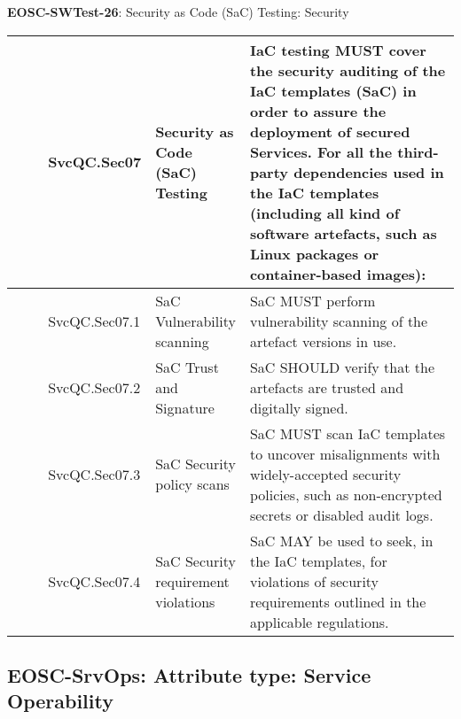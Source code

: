 \textbf{EOSC-SWTest-26}: Security as Code (SaC) Testing: Security
\nopagebreak[4]
\begin{center}
    \tabletail{\hline}
    \tiny
    \begin{supertabular}{|p{0.10\linewidth}|p{0.10\linewidth}|p{0.20\linewidth}|p{0.60\linewidth}|} \hline
        \cite{orviz_fernandez_eosc-synergy_2020} & SvcQC.Sec07 & Security as Code (SaC) Testing & IaC testing MUST cover the security auditing of the IaC templates (SaC) in order to assure the deployment of secured Services. For all the third-party dependencies used in the IaC templates (including all kind of software artefacts, such as Linux packages or container-based images):\\ \hline
        \cite{orviz_fernandez_eosc-synergy_2020} & SvcQC.Sec07.1 & SaC Vulnerability scanning & SaC MUST perform vulnerability scanning of the artefact versions in use.\\ \hline
        \cite{orviz_fernandez_eosc-synergy_2020} & SvcQC.Sec07.2 & SaC Trust and Signature & SaC SHOULD verify that the artefacts are trusted and digitally signed.\\ \hline
        \cite{orviz_fernandez_eosc-synergy_2020} & SvcQC.Sec07.3 & SaC Security policy scans & SaC MUST scan IaC templates to uncover misalignments with widely-accepted security policies, such as non-encrypted secrets or disabled audit logs.\\ \hline
        \cite{orviz_fernandez_eosc-synergy_2020} & SvcQC.Sec07.4 & SaC Security requirement violations & SaC MAY be used to seek, in the IaC templates, for violations of security requirements outlined in the applicable regulations.\\ \hline
    \end{supertabular}
\end{center}

\subsection{EOSC-SrvOps: Attribute type: Service Operability}

